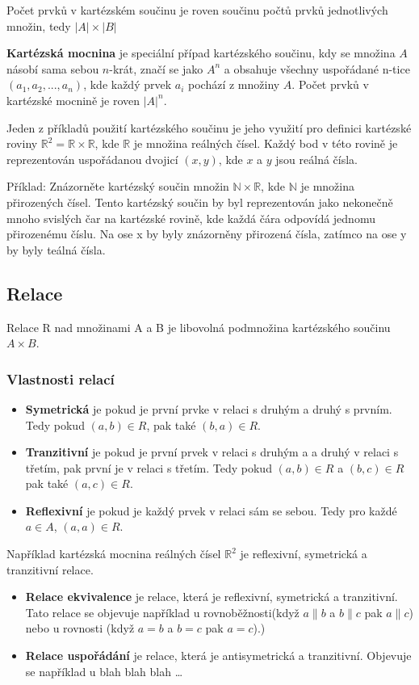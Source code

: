 \documentclass[12pt]{article}
\begin{document}
Počet prvků v kartézském součinu je roven součinu počtů prvků jednotlivých množin, tedy $|A| \times |B|$

\textbf{Kartézská mocnina} je speciální případ kartézského součinu, kdy se množina $A$ násobí sama sebou $n$-krát, značí se jako \textbf{$A^n$} a obsahuje všechny uspořádané n-tice $(a_1, a_2, ..., a_n)$, kde každý prvek $a_i$ pochází z množiny $A$. Počet prvků v kartézské mocnině je roven $|A|^n$.

Jeden z příkladů použití kartézského součinu je jeho využití pro definici kartézské roviny $\mathbb{R}^2 = \mathbb{R} \times \mathbb{R}$, kde $\mathbb{R}$ je množina reálných čísel. Každý bod v této rovině je reprezentován uspořádanou dvojicí $(x, y)$, kde $x$ a $y$ jsou reálná čísla.

Příklad: Znázorněte kartézský součin množin $\mathbb{N} \times \mathbb{R}$, kde $\mathbb{N}$ je množina přirozených čísel. Tento kartézský součin by byl reprezentován jako nekonečně mnoho svislých čar na kartézské rovině, kde každá čára odpovídá jednomu přirozenému číslu. Na ose x by byly znázorněny přirozená čísla, zatímco na ose y by byly teálná čísla. 

\subsection*{Relace}
Relace R nad množinami A a B je libovolná podmnožina kartézského součinu $A \times B $.

\subsubsection*{Vlastnosti relací}
\begin{itemize}[itemsep = 2pt]
    \item \textbf{Symetrická} je pokud je první prvke v relaci s druhým a druhý s prvním. Tedy pokud $(a, b) \in R$, pak také $(b, a) \in R$.
    \item \textbf{Tranzitivní} je pokud je první prvek v relaci s druhým a a druhý v relaci s třetím, pak první je v relaci s třetím. Tedy pokud $(a,b) \in R$ a $(b,c) \in R$ pak také $(a,c) \in R$. 
    \item \textbf{Reflexivní} je pokud je každý prvek v relaci sám se sebou. Tedy pro každé $a \in A$, $(a, a) \in R$.
\end{itemize}
Například kartézská mocnina reálných čísel $\mathbb{R}^2$ je reflexivní, symetrická a tranzitivní relace. 
\begin{itemize}[itemsep = 2pt]
    \item \textbf{Relace ekvivalence} je relace, která je reflexivní, symetrická a tranzitivní. Tato relace se objevuje například u rovnoběžnosti(když $a \parallel b$ a $b \parallel c$ pak $a \parallel c$) nebo u rovnosti (když $a = b$ a $b = c$ pak $a = c$).)
    \item \textbf{Relace uspořádání} je relace, která je antisymetrická a tranzitivní. Objevuje se například u blah blah blah \dots
\end{itemize}
\end{document}
